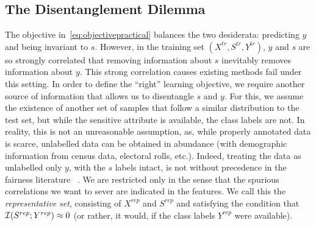 \subsection{The Disentanglement Dilemma}
The objective in~\eqref{eq:objectivepractical} balances the two desiderata: predicting $y$ and
being invariant to $s$.
%
However, in the training set $(X^{tr}, S^{tr}, Y^{tr})$, $y$ and $s$ are so strongly correlated
that removing information about $s$ inevitably removes information about $y$.
This strong correlation causes existing methods fail under this setting.
In order to define the ``right'' learning objective, we require another source of information that
allows us to disentangle $s$ and $y$.
%
For this, we assume the existence of another set of samples that follow a similar distribution to
the test set, but while the sensitive attribute is available, the class labels are not. 
%
In reality, this is not an unreasonable assumption, as, while properly annotated data is scarce,
unlabelled data can be obtained in abundance (with demographic information from census data,
electoral rolls, etc.).
%
Indeed, treating the data as unlabelled only \wrt{} \(y\), with the $s$ labels intact, is not
without precedence  in the fairness literature ~\citep{wick2019unlocking}.
%
We are restricted only in the sense that the spurious correlations we want to sever are indicated
in the features.
%
We call this the \emph{representative set}, consisting of $X^{rep}$ and $S^{rep}$ and satisfying
the condition that ${\mathcal{I}}(S^{rep}; Y^{rep}) \approx 0$ (or rather, it would, if the class labels
$Y^{rep}$ were available).

